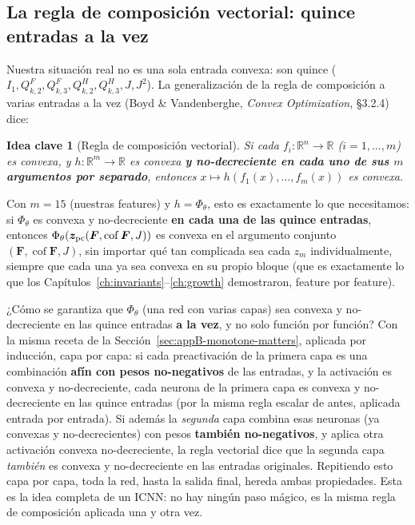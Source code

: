 \documentclass[11pt,a4paper]{article}
\newtheorem{takeaway}{Idea clave}
\newcommand{\Cof}{\operatorname{cof}}
\newcommand{\R}{\mathbb{R}}
\begin{document}
\subsection{La regla de composici\'on vectorial: quince entradas a la vez}
\label{sec:appB-many-inputs}

Nuestra situaci\'on real no es una sola entrada convexa: son quince
($I_1,Q_{k,2}^F,Q_{k,3}^F,Q_{k,2}^H,Q_{k,3}^H,J,J^2$). La generalizaci\'on
de la regla de composici\'on a varias entradas a la vez (Boyd \&
Vandenberghe, \emph{Convex Optimization}, \S3.2.4) dice:

\begin{takeaway}[Regla de composici\'on vectorial]
Si cada $f_i:\R^n\to\R$ ($i=1,\dots,m$) es convexa, y
$h:\R^m\to\R$ es convexa \textbf{y no-decreciente en cada uno de sus $m$
argumentos por separado}, entonces $x\mapsto h(f_1(x),\dots,f_m(x))$ es
convexa.
\end{takeaway}

Con $m=15$ (nuestras features) y $h=\Phi_\theta$, esto es exactamente lo
que necesitamos: si $\Phi_\theta$ es convexa y no-decreciente
\textbf{en cada una de las quince entradas}, entonces
$\Phi_\theta(\bm z_{\rm pc}(\bm F,\Cof\bm F,J))$ es convexa en el
argumento conjunto $(\bm F,\Cof\bm F,J)$, sin importar qu\'e tan
complicada sea cada $z_m$ individualmente, siempre que cada una ya sea
convexa en su propio bloque (que es exactamente lo que los
Cap\'itulos~\ref{ch:invariants}--\ref{ch:growth} demostraron, feature por
feature).

¿C\'omo se garantiza que $\Phi_\theta$ (una red con varias capas) sea
convexa y no-decreciente en las quince entradas \textbf{a la vez}, y no
solo funci\'on por funci\'on? Con la misma receta de la
Secci\'on~\ref{sec:appB-monotone-matters}, aplicada por inducci\'on,
capa por capa: si cada preactivaci\'on de la primera capa es una
combinaci\'on \textbf{af\'in con pesos no-negativos} de las entradas, y
la activaci\'on es convexa y no-decreciente, cada neurona de la primera
capa es convexa y no-decreciente en las quince entradas (por la misma
regla escalar de antes, aplicada entrada por entrada). Si adem\'as la
\emph{segunda} capa combina esas neuronas (ya convexas y no-decrecientes)
con pesos \textbf{tambi\'en no-negativos}, y aplica otra activaci\'on
convexa no-decreciente, la regla vectorial dice que la segunda capa
\emph{tambi\'en} es convexa y no-decreciente en las entradas originales.
Repitiendo esto capa por capa, toda la red, hasta la salida final, hereda
ambas propiedades. Esta es la idea completa de un ICNN: no hay ning\'un
paso m\'agico, es la misma regla de composici\'on aplicada una y otra
vez.
\end{document}

